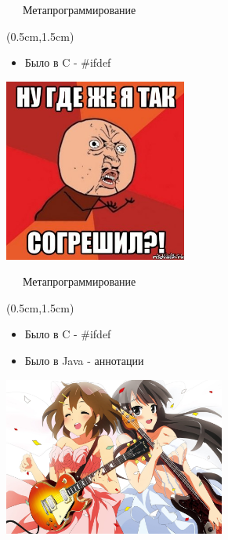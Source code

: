\documentclass[xetex,18pt,aspectratio=43]{beamer}
\begin{document}
\begin{Large}
\begin{frame}{\ \ \ Метапрограммирование}
\begin{textblock*}{\framewidth}(0.5cm,1.5cm)
\begin{itemize}
  \item Было в C - \#ifdef
\end{itemize}
\begin{minipage}{\textwidth}
  \centering
  \includegraphics[height=6.0cm]{img/pain}
\end{minipage}
\end{textblock*}
\end{frame}

\begin{frame}{\ \ \ Метапрограммирование}
\begin{textblock*}{\framewidth}(0.5cm,1.5cm)
\begin{itemize}
  \item Было в C - \#ifdef
  \item Было в Java - аннотации
\end{itemize}
\begin{minipage}{\textwidth}
  \centering
  \includegraphics[height=5.2cm]{img/happiness}
\end{minipage}
\end{textblock*}
\end{frame}


\end{Large}
\end{document}
